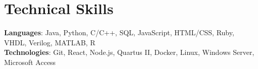 \documentclass[letterpaper,11pt]{article}
\begin{document}
\section{Technical Skills}
 \begin{itemize}[leftmargin=0.15in, label={}]
    \small{\item{
     \textbf{Languages}{: Java, Python, C/C++, SQL, JavaScript, HTML/CSS, Ruby, VHDL, Verilog, MATLAB, R} \\
     \textbf{Technologies}{: Git, React, Node.js, Quartus II, Docker, Linux, Windows Server, Microsoft Access} 
    }}
 \end{itemize}
 
\end{document}
